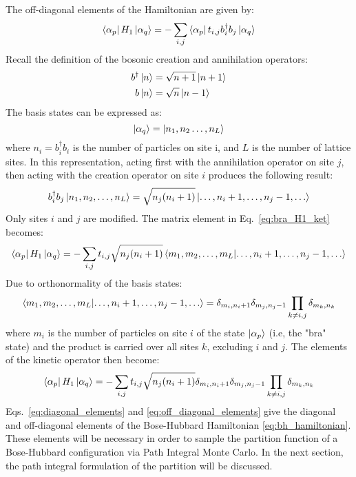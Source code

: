 \documentclass[12pt, two sided]{article}
\begin{document}
The off-diagonal elements of the Hamiltonian are given by:
%
\begin{equation}
\label{eq:bra_H1_ket}
\bra{\alpha_p} H_1 \ket{\alpha_q} = - \sum_{i,j} \bra{\alpha_p} t_{i,j} b_i^{\dag} b_j \ket{\alpha_q}
\end{equation}
%
Recall the definition of the bosonic creation and annihilation operators:
%
\begin{align}
b^\dag \ket{n} &= \sqrt{n+1} \ket{n+1} \\
b \ket{n} &= \sqrt{n} \ket{n-1} 
\end{align}
%
The basis states can be expressed as:
%
\begin{equation}
\ket{\alpha_q} = \ket{n_1,n_2 \dots , n_L}
\end{equation}
%
where $n_i = b_i^\dag b_i$ is the number of particles on site i, and $L$ is the number of lattice sites. In this representation, acting first with the annihilation operator on site $j$, then acting with the creation operator on site $i$ produces the following result:
%
\begin{equation}
b_i^\dag b_j \ket{n_1,n_2,\dots,n_L} = \sqrt{n_j(n_i+1)} \ket{\dots , n_i+1, \dots, n_j-1, \dots} 
\end{equation}
%
Only sites $i$ and $j$ are modified. The matrix element in Eq.~\eqref{eq:bra_H1_ket} becomes:
%
\begin{equation}
\bra{\alpha_p} H_1 \ket{\alpha_q} = -\sum_{i,j} t_{i,j} \sqrt{n_j(n_i+1)} \bra{m_1,m_2,\dots,m_L} \ket{\dots , n_i+1, \dots, n_j-1, \dots} 
\end{equation}
%
Due to orthonormality of the basis states:
%
\begin{equation}
\bra{m_1,m_2,\dots,m_L} \ket{\dots , n_i+1, \dots, n_j-1, \dots}  = \delta_{m_i, n_i+1} \delta_{m_j,n_j-1} \prod_{k \neq i,j} \delta_{m_k,n_k}
\end{equation}
%
where $m_i$ is the number of particles on site $i$ of the state $\ket{\alpha_p}$ (i.e, the "bra" state) and the product is carried over all sites $k$, excluding $i$ and $j$. The elements of the kinetic operator then become:
%
\begin{equation}
\label{eq:off_diagonal_elements}
\bra{\alpha_p} H_1 \ket{\alpha_q} = -\sum_{i,j} t_{i,j} \sqrt{n_j(n_i+1)} \delta_{m_i, n_i+1} \delta_{m_j,n_j-1} \prod_{k \neq i,j} \delta_{m_k,n_k}
\end{equation}
%
Eqs.~\eqref{eq:diagonal_elements} and \eqref{eq:off_diagonal_elements} give the diagonal and off-diagonal elements of the Bose-Hubbard Hamiltonian \eqref{eq:bh_hamiltonian}. These elements will be necessary in order to sample the partition function of a Bose-Hubbard configuration via Path Integral Monte Carlo. In the next section, the path integral formulation of the partition will be discussed.
 
\end{document}
